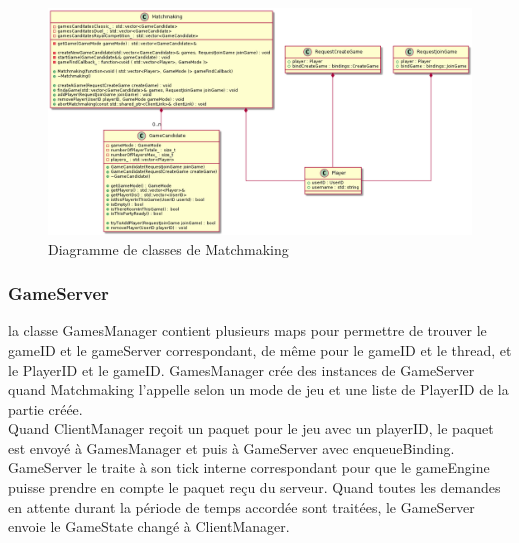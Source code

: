 \documentclass{article}
\begin{document}
\begin{figure}[H]
	\centering
	 \includegraphics[scale=0.4]{../../res/uml/class/MatchMakingClass.png}
	 \caption{Diagramme de classes de Matchmaking}
	 \label{fig:MatchmakingDiagram}
\end{figure}

\subsubsection{GameServer}

la classe GamesManager contient plusieurs maps pour permettre de trouver le gameID et le gameServer correspondant, de même pour le gameID et le thread, et le PlayerID et le gameID. GamesManager crée des instances de GameServer quand Matchmaking l'appelle selon un mode de jeu et une liste de PlayerID de la partie créée. \\
Quand ClientManager reçoit un paquet pour le jeu avec un playerID, le paquet est envoyé à GamesManager et puis à GameServer avec enqueueBinding. GameServer le traite à son tick interne correspondant pour que le gameEngine puisse prendre en compte le paquet reçu du serveur. Quand toutes les demandes en attente durant la période de temps accordée sont traitées, le GameServer envoie le GameState changé à ClientManager. 
\end{document}
